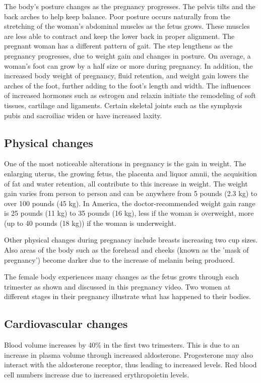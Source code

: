 \documentclass[12pt,a4paper,onecolumn]{article}
\begin{document}
The body's posture changes as the pregnancy progresses. The pelvis tilts and the back arches to help
keep balance. Poor posture occurs naturally from the stretching of the woman's abdominal muscles as
the fetus grows. These muscles are less able to contract and keep the lower back in proper
alignment. The pregnant woman has a different pattern of gait. The step lengthens as the pregnancy
progresses, due to weight gain and changes in posture. On average, a woman's foot can grow by a half
size or more during pregnancy. In addition, the increased body weight of pregnancy, fluid retention,
and weight gain lowers the arches of the foot, further adding to the foot's length and width. The
influences of increased hormones such as estrogen and relaxin initiate the remodeling of soft
tissues, cartilage and ligaments. Certain skeletal joints such as the symphysis pubis and sacroiliac
widen or have increased laxity.

\subsection{Physical changes}

One of the most noticeable alterations in pregnancy is the gain in weight. The enlarging uterus, the
growing fetus, the placenta and liquor amnii, the acquisition of fat and water retention, all
contribute to this increase in weight. The weight gain varies from person to person and can be
anywhere from 5 pounds (2.3 kg) to over 100 pounds (45 kg). In America, the doctor-recommended
weight gain range is 25 pounds (11 kg) to 35 pounds (16 kg), less if the woman is overweight, more
(up to 40 pounds (18 kg)) if the woman is underweight.

Other physical changes during pregnancy include breasts increasing two cup sizes. Also areas of the
body such as the forehead and cheeks (known as the 'mask of pregnancy') become darker due to the
increase of melanin being produced.

The female body experiences many changes as the fetus grows through each trimester as shown and
discussed in this pregnancy video. Two women at different stages in their pregnancy illustrate what
has happened to their bodies.

\subsection{Cardiovascular changes}

Blood volume increases by 40\% in the first two trimesters. This is due to an increase in plasma
volume through increased aldosterone. Progesterone may also interact with the aldosterone receptor,
thus leading to increased levels. Red blood cell numbers increase due to increased erythropoietin
levels.
\end{document}
